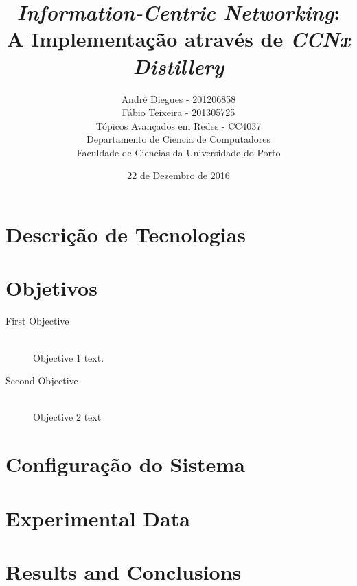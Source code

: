 \documentclass{article}
\title{\textit{Information-Centric Networking}:\\A Implementação através de \textit{CCNx Distillery}} %
\author{André Diegues - 201206858 \\ Fábio Teixeira - 201305725\\ %
		T\'{o}picos Avan\c{c}ados em Redes - CC4037\\
		Departamento de Ciencia de Computadores\\
		Faculdade de Ciencias da Universidade do Porto
}
\date{22 de Dezembro de 2016} %
\begin{document}
\maketitle %

\tableofcontents

\section{Descrição de Tecnologias}


\section{Objetivos}




\begin{description}
\item[First Objective] \hfill \\
Objective 1 text\cite{Smith:2012qr}.
\item[Second Objective] \hfill \\
Objective 2 text
\end{description}

\section{Configuração do Sistema}

\section{Experimental Data}

\section{Results and Conclusions}





\end{document}

